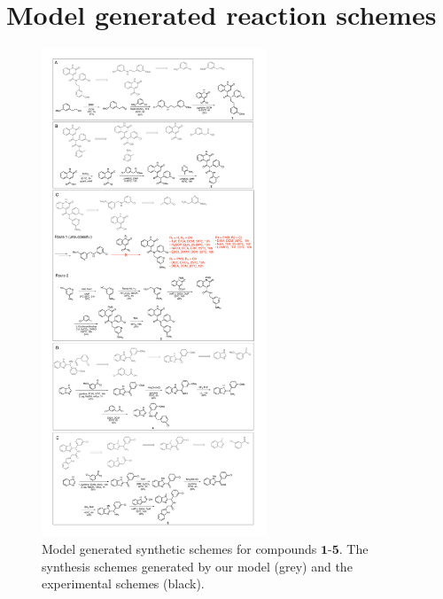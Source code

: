 \section{Model generated reaction schemes} \label{appendix:rxn_schemes}
\begin{figure}
    \centering
        \includegraphics[width=0.6\textwidth]{Chapters/Ranking/Figs/rxn_schemes_full.pdf}
        \caption{Model generated synthetic schemes for compounds $\mathbf{1}$-$\mathbf{5}$. The synthesis schemes generated by our model (grey) and the experimental schemes (black).}
        \label{fig:appendix_synthesis_schemes}
\end{figure}

